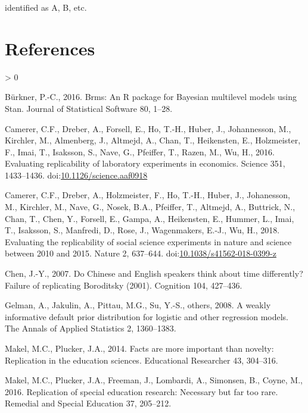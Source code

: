\documentclass[]{elsarticle} %
\newlength{\cslhangindent}
\newenvironment{CSLReferences}[2] %
 {%
  \setlength{\parindent}{0pt}
  \ifodd #1 \everypar{\setlength{\hangindent}{\cslhangindent}}\ignorespaces\fi
  \ifnum #2 > 0
  \setlength{\parskip}{#2\baselineskip}
  \fi
 }%
 {}
\begin{document}
identified as A, B, etc.

\hypertarget{references}{%
\section*{References}\label{references}}

\hypertarget{refs}{}
\begin{CSLReferences}{1}{0}
\leavevmode\hypertarget{ref-burkner_brms_2016}{}%
Bürkner, P.-C., 2016. Brms: {An} {R} package for {Bayesian} multilevel
models using {Stan}. Journal of Statistical Software 80, 1--28.

\leavevmode\hypertarget{ref-camerer_economics_2016}{}%
Camerer, C.F., Dreber, A., Forsell, E., Ho, T.-H., Huber, J.,
Johannesson, M., Kirchler, M., Almenberg, J., Altmejd, A., Chan, T.,
Heikensten, E., Holzmeister, F., Imai, T., Isaksson, S., Nave, G.,
Pfeiffer, T., Razen, M., Wu, H., 2016. Evaluating replicability of
laboratory experiments in economics. Science 351, 1433--1436.
doi:\href{https://doi.org/10.1126/science.aaf0918}{10.1126/science.aaf0918}

\leavevmode\hypertarget{ref-camerer_socscience_2018}{}%
Camerer, C.F., Dreber, A., Holzmeister, F., Ho, T.-H., Huber, J.,
Johanesson, M., Kirchler, M., Nave, G., Nosek, B.A., Pfeiffer, T.,
Altmejd, A., Buttrick, N., Chan, T., Chen, Y., Forsell, E., Gampa, A.,
Heikensten, E., Hummer, L., Imai, T., Isaksson, S., Manfredi, D., Rose,
J., Wagenmakers, E.-J., Wu, H., 2018. Evaluating the replicability of
social science experiments in nature and science between 2010 and 2015.
Nature 2, 637--644.
doi:\href{https://doi.org/10.1038/s41562-018-0399-z}{10.1038/s41562-018-0399-z}

\leavevmode\hypertarget{ref-chen_chinese_2007}{}%
Chen, J.-Y., 2007. Do {Chinese} and {English} speakers think about time
differently? {Failure} of replicating {Boroditsky} (2001). Cognition
104, 427--436.

\leavevmode\hypertarget{ref-gelman_weakly_2008}{}%
Gelman, A., Jakulin, A., Pittau, M.G., Su, Y.-S., others, 2008. A weakly
informative default prior distribution for logistic and other regression
models. The Annals of Applied Statistics 2, 1360--1383.

\leavevmode\hypertarget{ref-makel2014facts}{}%
Makel, M.C., Plucker, J.A., 2014. Facts are more important than novelty:
Replication in the education sciences. Educational Researcher 43,
304--316.

\leavevmode\hypertarget{ref-makel_replications_2016}{}%
Makel, M.C., Plucker, J.A., Freeman, J., Lombardi, A., Simonsen, B.,
Coyne, M., 2016. Replication of special education research: Necessary
but far too rare. Remedial and Special Education 37, 205--212.


\end{CSLReferences}
\end{document}

